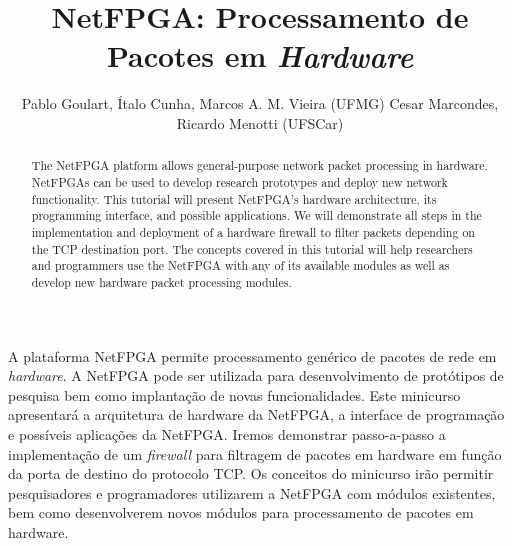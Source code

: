 \documentclass{SBCbookchapter}
\author{\vspace{2mm}Pablo Goulart, Ítalo Cunha, Marcos A. M. Vieira (UFMG)
\newline
Cesar Marcondes, Ricardo Menotti (UFSCar)}
\title{NetFPGA: Processamento de Pacotes em \emph{Hardware}}
\begin{document}
\maketitle


\begin{abstract}

The NetFPGA platform allows general-purpose network packet
processing in hardware. NetFPGAs can be used to develop research
prototypes and deploy new network functionality. This tutorial will
present NetFPGA's hardware architecture, its programming interface,
and possible applications. We will demonstrate all steps in the
implementation and deployment of a hardware firewall to filter
packets depending on the TCP destination port.  The concepts covered
in this tutorial will help researchers and programmers use the
NetFPGA with any of its available modules as well as develop new
hardware packet processing modules.

\end{abstract}


\begin{resumo}

A plataforma NetFPGA permite processamento genérico de pacotes de
rede em \emph{hardware}. A NetFPGA pode ser utilizada para
desenvolvimento de protótipos de pesquisa bem como implantação de
novas funcionalidades.  Este minicurso apresentará a arquitetura de
hardware da NetFPGA, a interface de programação e possíveis
aplicações da NetFPGA. Iremos demonstrar passo-a-passo a
implementação de um \emph{firewall} para filtragem de pacotes em
hardware em função da porta de destino do protocolo TCP.  Os
conceitos do minicurso irão permitir pesquisadores e programadores
utilizarem a NetFPGA com módulos existentes, bem como desenvolverem
novos módulos para processamento de pacotes em hardware.

\end{resumo}















\newpage


\end{document}
